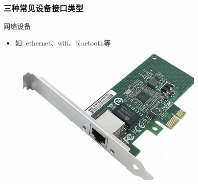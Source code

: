 % 
\begin{frame}[fragile]
    \frametitle{三种常见设备接口类型}
    网络设备
    \begin{itemize}
        \item 如: ethernet、wifi、bluetooth等
    \end{itemize}
    \begin{figure}
        \includegraphics[width=0.47\linewidth]{figs/net-dev.png}
    \end{figure}
\end{frame}
